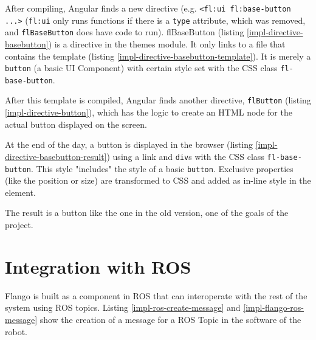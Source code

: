 

After compiling, Angular finds a new directive (e.g.  \lstinline$<fl:ui fl:base-button ...>$ (\texttt{fl:ui} only runs functions if there is a \texttt{type} attribute, which was removed, and \texttt{flBaseButton} does have code to run).
flBaseButton (listing \ref{impl-directive-basebutton}) is a directive in the themes module.
It only links to a file that contains the template (listing \ref{impl-directive-basebutton-template}).
It is merely a \texttt{button} (a basic UI Component) with certain style set with the \ac{CSS} class \texttt{fl-base-button}.




After this template is compiled, Angular finds another directive, \texttt{flButton} (listing \ref{impl-directive-button}), which has the logic to create an \ac{HTML} node for the actual button displayed on the screen.





At the end of the day, a button is displayed in the browser (listing \ref{impl-directive-basebutton-result}) using a link and \texttt{div}s with the \ac{CSS} class \texttt{fl-base-button}.
This style "includes" the style of a basic \texttt{button}.
Exclusive properties (like the position or size) are transformed to \ac{CSS} and added as in-line style in the element.

The result is a button like the one in the old version, one of the goals of the project.


\section{Integration with ROS}
\label{sec:integration-with-ROS}
Flango \cm is built as a component in \ac{ROS} that can interoperate with the rest of the system using \ac{ROS} topics.
Listing \ref{impl-ros-create-message} and \ref{impl-flango-ros-message} show the creation of a message for a ROS Topic in the software of the robot.

